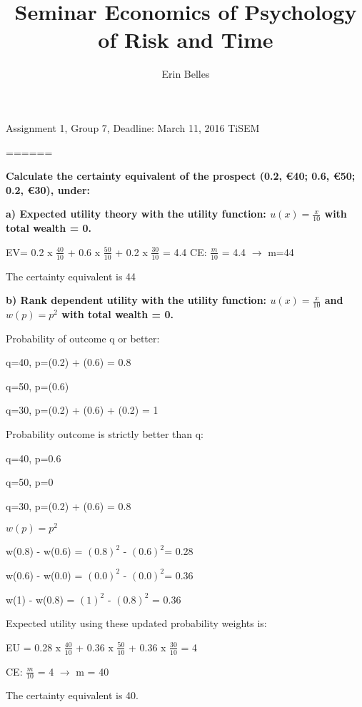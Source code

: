 \documentclass{article}
\title{Seminar Economics of Psychology of Risk and Time}
\author{Erin Belles}
\begin{document}
\maketitle 
 Assignment 1, Group 7, Deadline: March 11, 2016 TiSEM 

======

\textbf{ Calculate the certainty equivalent of the prospect (0.2, €40; 0.6, €50; 0.2, €30), under: } 

\vspace{4mm}

\textbf{ a) Expected utility theory with the utility function: 
$u(x) = \frac{x}{10}$ 
	with total wealth = 0.} 

	\vspace{2mm}
		EV=	0.2	x $\frac{40}{10}$ +	0.6	x $\frac{50}{10}$ + 0.2 x $\frac{30}{10}$ =	4.4
	CE:	$\frac{m}{10}$ = 4.4 $\rightarrow$ m=44 
	
	The	certainty equivalent is	44
	\vspace{4mm}
	
	\textbf{ b) Rank dependent utility with the utility function:
$u(x) = \frac{x}{10}$ and $w(p) = p^{2}$
	 with total wealth = 0.}   

\vspace{2mm}
Probability	of	outcome	q	or	better:

q=40,	p=(0.2)	 +	(0.6)	=	0.8

q=50,	p=(0.6)

q=30,	p=(0.2)	 +	(0.6)	+ (0.2)	=	1

\vspace {2mm}

Probability	outcome	is	strictly	better	than q:


q=40,	p=0.6

q=50,	p=0

q=30,	p=(0.2)	+	(0.6)	=	0.8

$w(p)=p^2$

w(0.8)	-	 w(0.6)	=	$(0.8)^2$ - $(0.6)^2$=	0.28

w(0.6)	-	 w(0.0)	=	$(0.0)^2$ - $(0.0)^2$=	0.36

w(1)	-	 w(0.8)	=	$(1)^2$ - $(0.8)^2$ =	0.36

\vspace {2mm}

Expected	utility	using	these	updated	probability	weights	is:

EU	=	0.28	x	$\frac{40}{10}$	 +	0.36 x	$\frac{50}{10}$	+	0.36 x $\frac{30}{10}$	=	4

CE:	$\frac{m}{10}$	=	4 $\rightarrow$ m	=	40

The	certainty	equivalent	is	40.
\end{document}
